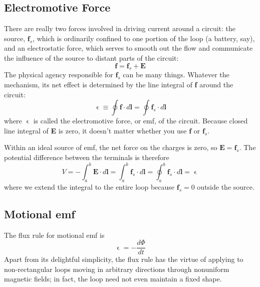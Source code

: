 \documentclass[../../../main.tex]{subfiles}
\begin{document}
\subsection{Electromotive Force}
There are really two forces involved in driving current around a circuit: the source, $\mathbf{f}_s$, which is ordinarily conﬁned to one portion of the loop (a battery, say), and an electrostatic force, which serves to smooth out the ﬂow and communicate the inﬂuence of the source to distant parts of the circuit:
\begin{equation*}
    \mathbf{f} = \mathbf{f}_s + \mathbf{E}
\end{equation*}
The physical agency responsible for $\mathbf{f}_s$ can be many things. Whatever the mechanism, its net effect is determined by the line integral of \textbf{f} around the circuit:
\begin{equation*}
    \upvarepsilon\equiv \oint\mathbf{f}\cdot d\mathbf{l}=\oint\mathbf{f}_s\cdot d\mathbf{l}
\end{equation*}
where $\upvarepsilon$ is called the electromotive force, or emf, of the circuit. Because closed line integral of \textbf{E} is zero, it doesn't matter whether you use $\mathbf{f}$ or $\mathbf{f}_s$.

Within an ideal source of emf, the net force on the charges is zero, so $\mathbf{E} = \mathbf{f}_s$. The potential difference between the terminals is therefore
\begin{equation*}
    V=-\int_{a}^{b}\mathbf{E}\cdot d\mathbf{l}=\int_{a}^{b}\mathbf{f}_s\cdot d\mathbf{l}= \oint_{a}^{b}\mathbf{f}_s\cdot d\mathbf{l}=\upvarepsilon
\end{equation*}
where we extend the integral to the entire loop because $\mathbf{f}_s = 0 $ outside the source.

\subsection{Motional emf}
The ﬂux rule for motional emf is 
\begin{equation*}
    \upvarepsilon=-\frac{d\Phi}{dt}
\end{equation*}
Apart from its delightful simplicity, the ﬂux rule has the virtue of applying to non-rectangular loops moving in arbitrary directions through nonuniform magnetic ﬁelds; in fact, the loop need not even maintain a ﬁxed shape.
\end{document}
